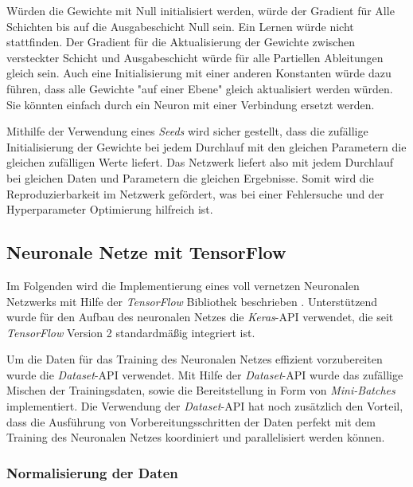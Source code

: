 \begin{description}
	Würden die Gewichte mit Null initialisiert werden, würde der Gradient für Alle Schichten bis auf die Ausgabeschicht Null sein. Ein Lernen würde nicht stattfinden. Der Gradient für die Aktualisierung der Gewichte zwischen versteckter Schicht und Ausgabeschicht würde für alle Partiellen Ableitungen gleich sein. Auch eine Initialisierung mit einer anderen Konstanten würde dazu führen, dass alle Gewichte "auf einer Ebene" gleich aktualisiert werden würden. Sie könnten einfach durch ein Neuron mit einer Verbindung ersetzt werden.
	
	Mithilfe der Verwendung eines \emph{Seeds} wird sicher gestellt, dass die zufällige Initialisierung der Gewichte bei jedem Durchlauf mit den gleichen Parametern die gleichen zufälligen Werte liefert. Das Netzwerk liefert also mit jedem Durchlauf bei gleichen Daten und Parametern die gleichen Ergebnisse. Somit wird die Reproduzierbarkeit im Netzwerk gefördert, was bei einer Fehlersuche und der Hyperparameter Optimierung hilfreich ist.
	
\end{description}
\subsection{Neuronale Netze mit TensorFlow}
Im Folgenden wird die Implementierung eines voll vernetzen Neuronalen Netzwerks mit Hilfe der \emph{TensorFlow} Bibliothek beschrieben \cite{tensorflow2015-whitepaper}. Unterstützend wurde für den Aufbau des neuronalen Netzes die \emph{Keras}-API verwendet, die seit \emph{TensorFlow} Version 2 standardmäßig integriert ist. 

Um die Daten für das Training des Neuronalen Netzes effizient vorzubereiten wurde die \emph{Dataset}-API verwendet. Mit Hilfe der \emph{Dataset}-API wurde das zufällige Mischen der Trainingsdaten, sowie die Bereitstellung in Form von \emph{Mini-Batches} implementiert. Die Verwendung der \emph{Dataset}-API hat noch zusätzlich den Vorteil, dass die Ausführung von Vorbereitungsschritten der Daten perfekt mit dem Training des Neuronalen Netzes koordiniert und parallelisiert werden können.

\subsubsection{Normalisierung der Daten}

